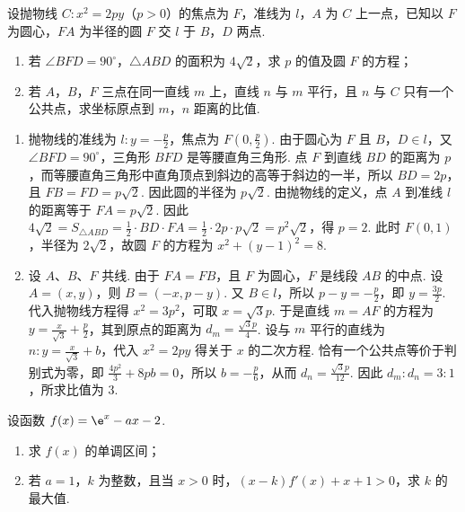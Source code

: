 \begin{problem}
设抛物线 \(C: x^{2} = 2py\)（\(p > 0\)）的焦点为 \(F\)，准线为 \(l\)，\(A\) 为 \(C\) 上一点，已知以 \(F\) 为圆心，\(FA\) 为半径的圆 \(F\) 交 \(l\) 于 \(B\)，\(D\) 两点.

\begin{enumerate}
\item 若 \(\angle BFD = 90^{\circ}\)，\(\triangle ABD\) 的面积为 \(4\sqrt{2}\)，求 \(p\) 的值及圆 \(F\) 的方程；
\item 若 \(A\)，\(B\)，\(F\) 三点在同一直线 \(m\) 上，直线 \(n\) 与 \(m\) 平行，且 \(n\) 与 \(C\) 只有一个公共点，求坐标原点到 \(m\)，\(n\) 距离的比值.
\end{enumerate}
\end{problem}

\begin{solution}
\begin{enumerate}
\item 抛物线的准线为 \(l:y=-\frac p2\)，焦点为 \(F(0,\frac p2)\). 由于圆心为 \(F\) 且 \(B\)，\(D\in l\)，又 \(\angle BFD=90^{\circ}\)，三角形 \(BFD\) 是等腰直角三角形. 点 \(F\) 到直线 \(BD\) 的距离为 \(p\)，而等腰直角三角形中直角顶点到斜边的高等于斜边的一半，所以 \(BD=2p\)，且 \(FB=FD=p\sqrt2\). 因此圆的半径为 \(p\sqrt2\). 由抛物线的定义，点 \(A\) 到准线 \(l\) 的距离等于 \(FA=p\sqrt2\). 因此
\(4\sqrt2=S_{\triangle ABD}=\frac12\cdot BD\cdot FA=\frac12\cdot2p\cdot p\sqrt2=p^2\sqrt2\)，得 \(p=2\). 此时 \(F(0,1)\)，半径为 \(2\sqrt2\)，故圆 \(F\) 的方程为 \(x^2+(y-1)^2=8\).
\item 设 \(A\)、\(B\)、\(F\) 共线. 由于 \(FA=FB\)，且 \(F\) 为圆心，\(F\) 是线段 \(AB\) 的中点. 设 \(A=(x,y)\)，则 \(B=(-x,p-y)\). 又 \(B\in l\)，所以 \(p-y=-\frac p2\)，即 \(y=\frac{3p}{2}\). 代入抛物线方程得 \(x^2=3p^2\)，可取 \(x=\sqrt3p\). 于是直线 \(m=AF\) 的方程为 \(y=\frac{x}{\sqrt3}+\frac p2\)，其到原点的距离为 \(d_m=\frac{\sqrt3p}{4}\). 设与 \(m\) 平行的直线为 \(n:y=\frac{x}{\sqrt3}+b\)，代入 \(x^2=2py\) 得关于 \(x\) 的二次方程. 恰有一个公共点等价于判别式为零，即 \(\frac{4p^2}{3}+8pb=0\)，所以 \(b=-\frac p6\)，从而 \(d_n=\frac{\sqrt3p}{12}\). 因此 \(d_m:d_n=3:1\)，所求比值为 \(3\).
\end{enumerate}
\end{solution}

\begin{problem}
设函数 \( f(x) = \e^{x} - ax - 2 \).

\begin{enumerate}
\item 求 \( f(x) \) 的单调区间；
\item 若 \(a = 1\)，\(k\) 为整数，且当 \(x > 0\) 时，\((x-k)f'(x) + x + 1 > 0\)，求 \(k\) 的最大值.
\end{enumerate}
\end{problem}

